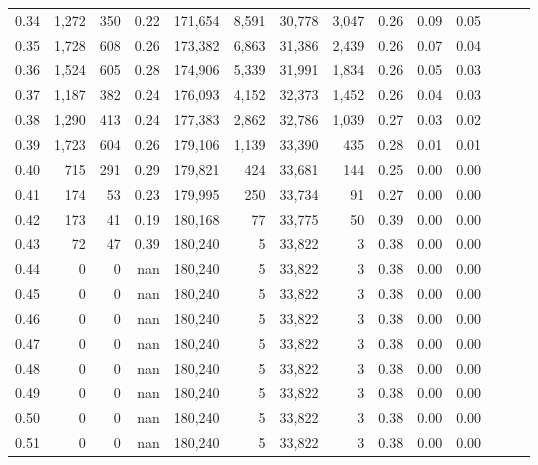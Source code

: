 \begin{tabular}{rrrrrrrrrrrrrr}
0.34 &   1,272 &    350 &  0.22 &  171,654 &    8,591 &  30,778 &   3,047 &  0.26 &  0.09 &      0.05 \\
0.35 &   1,728 &    608 &  0.26 &  173,382 &    6,863 &  31,386 &   2,439 &  0.26 &  0.07 &      0.04 \\
0.36 &   1,524 &    605 &  0.28 &  174,906 &    5,339 &  31,991 &   1,834 &  0.26 &  0.05 &      0.03 \\
0.37 &   1,187 &    382 &  0.24 &  176,093 &    4,152 &  32,373 &   1,452 &  0.26 &  0.04 &      0.03 \\
0.38 &   1,290 &    413 &  0.24 &  177,383 &    2,862 &  32,786 &   1,039 &  0.27 &  0.03 &      0.02 \\
0.39 &   1,723 &    604 &  0.26 &  179,106 &    1,139 &  33,390 &     435 &  0.28 &  0.01 &      0.01 \\
0.40 &     715 &    291 &  0.29 &  179,821 &      424 &  33,681 &     144 &  0.25 &  0.00 &      0.00 \\
0.41 &     174 &     53 &  0.23 &  179,995 &      250 &  33,734 &      91 &  0.27 &  0.00 &      0.00 \\
0.42 &     173 &     41 &  0.19 &  180,168 &       77 &  33,775 &      50 &  0.39 &  0.00 &      0.00 \\
0.43 &      72 &     47 &  0.39 &  180,240 &        5 &  33,822 &       3 &  0.38 &  0.00 &      0.00 \\
0.44 &       0 &      0 &   nan &  180,240 &        5 &  33,822 &       3 &  0.38 &  0.00 &      0.00 \\
0.45 &       0 &      0 &   nan &  180,240 &        5 &  33,822 &       3 &  0.38 &  0.00 &      0.00 \\
0.46 &       0 &      0 &   nan &  180,240 &        5 &  33,822 &       3 &  0.38 &  0.00 &      0.00 \\
0.47 &       0 &      0 &   nan &  180,240 &        5 &  33,822 &       3 &  0.38 &  0.00 &      0.00 \\
0.48 &       0 &      0 &   nan &  180,240 &        5 &  33,822 &       3 &  0.38 &  0.00 &      0.00 \\
0.49 &       0 &      0 &   nan &  180,240 &        5 &  33,822 &       3 &  0.38 &  0.00 &      0.00 \\
0.50 &       0 &      0 &   nan &  180,240 &        5 &  33,822 &       3 &  0.38 &  0.00 &      0.00 \\
0.51 &       0 &      0 &   nan &  180,240 &        5 &  33,822 &       3 &  0.38 &  0.00 &      0.00 \\

\end{tabular}
